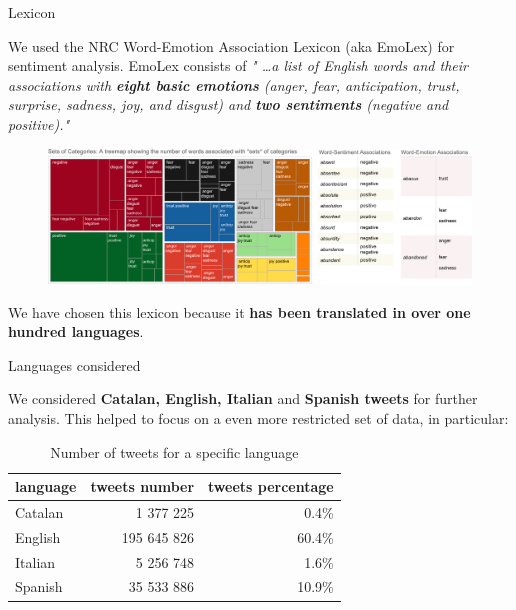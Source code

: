 \documentclass[8pt]{beamer}  %
\begin{document}
\begin{frame}{Lexicon}

	We used the NRC Word-Emotion Association Lexicon (aka EmoLex) \autocite{ncrwebsite} for sentiment analysis. EmoLex consists of \textit{" \ldots a list of English words and their associations with \textbf{eight basic emotions} (anger, fear, anticipation, trust, surprise, sadness, joy, and disgust) and \textbf{two sentiments} (negative and positive)."}
	
	\begin{figure}
	    \centering
	    \includegraphics[scale=0.26]{assets/img/NRC Emotion Lexicon.png}
	\end{figure}
	
	We have chosen this lexicon because it \textbf{has been translated in over one hundred languages}.

\end{frame}

\begin{frame}{Languages considered}
    
	We considered \textbf{Catalan, English, Italian} and \textbf{Spanish tweets} for further analysis. This helped to focus on a even more restricted set of data, in particular:
	
	\begin{table}[h]
        \centering
        \begin{tabularx}{\textwidth}{Xrr}
            language & tweets number & tweets percentage \\
            \midrule
                Catalan & 1 377 225 & 0.4\%
                \\ \lightrule
                English & 195 645 826 & 60.4\%
                \\ \lightrule
                Italian & 5 256 748 & 1.6\%
                \\ \lightrule
                Spanish & 35 533 886 & 10.9\%
        \end{tabularx}
        \caption{Number of tweets for a specific language}
        \label{tab:lang_dim}
    \end{table}
	
\end{frame}
\end{document}
